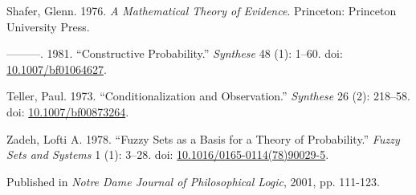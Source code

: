 \documentclass[
  11pt,
  letterpaper,
  DIV=11,
  numbers=noendperiod,
  twoside]{scrartcl}
\newlength{\cslhangindent}
\newenvironment{CSLReferences}[2] %
 {\begin{list}{}{%
  \setlength{\itemindent}{0pt}
  \setlength{\leftmargin}{0pt}
  \setlength{\parsep}{0pt}
  \ifodd #1
   \setlength{\leftmargin}{\cslhangindent}
   \setlength{\itemindent}{-1\cslhangindent}
  \fi
  \setlength{\itemsep}{#2\baselineskip}}}
 {\end{list}}
\begin{document}
\begin{CSLReferences}{1}{0}
Shafer, Glenn. 1976. \emph{A Mathematical Theory of Evidence}.
Princeton: Princeton University Press.

---------. 1981. {``Constructive Probability.''} \emph{Synthese} 48 (1):
1--60. doi:
\href{https://doi.org/10.1007/bf01064627}{10.1007/bf01064627}.

Teller, Paul. 1973. {``Conditionalization and Observation.''}
\emph{Synthese} 26 (2): 218--58. doi:
\href{https://doi.org/10.1007/bf00873264}{10.1007/bf00873264}.

Zadeh, Lofti A. 1978. {``Fuzzy Sets as a Basis for a Theory of
Probability.''} \emph{Fuzzy Sets and Systems} 1 (1): 3--28. doi:
\href{https://doi.org/10.1016/0165-0114(78)90029-5}{10.1016/0165-0114(78)90029-5}.

\end{CSLReferences}



\noindent Published in\emph{
Notre Dame Journal of Philosophical Logic}, 2001, pp. 111-123.
\end{document}
